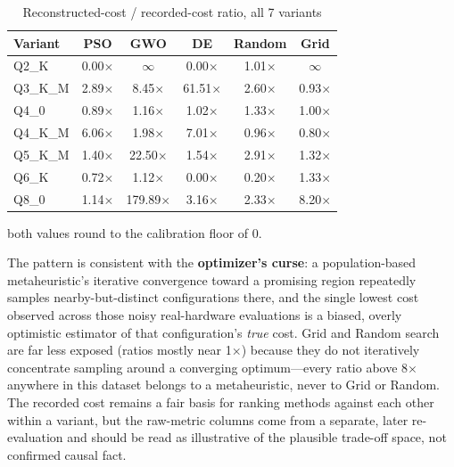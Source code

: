 \documentclass[conference, letterpaper]{IEEEtran}
\begin{document}
\begin{table}[t]
\caption{Reconstructed-cost / recorded-cost ratio, all 7 variants}
\label{tab:reconciliation}
\centering
\footnotesize
\begin{threeparttable}
\begin{tabular}{@{}lccccc@{}}
\toprule
Variant & PSO & GWO & DE & Random & Grid \\
\midrule
Q2\_K    & 0.00$\times$\tnote{c} & $\infty$\tnote{c} & 0.00$\times$\tnote{c} & 1.01$\times$ & $\infty$\tnote{c} \\
Q3\_K\_M & 2.89$\times$ & 8.45$\times$ & 61.51$\times$ & 2.60$\times$ & 0.93$\times$ \\
Q4\_0    & 0.89$\times$ & 1.16$\times$ & 1.02$\times$ & 1.33$\times$ & 1.00$\times$ \\
Q4\_K\_M & 6.06$\times$ & 1.98$\times$ & 7.01$\times$ & 0.96$\times$ & 0.80$\times$ \\
Q5\_K\_M & 1.40$\times$ & 22.50$\times$ & 1.54$\times$ & 2.91$\times$ & 1.32$\times$ \\
Q6\_K    & 0.72$\times$ & 1.12$\times$ & 0.00$\times$\tnote{c} & 0.20$\times$ & 1.33$\times$ \\
Q8\_0    & 1.14$\times$ & 179.89$\times$ & 3.16$\times$ & 2.33$\times$ & 8.20$\times$ \\
\bottomrule
\end{tabular}
\begin{tablenotes}
\item[c] {\scriptsize both values round to the calibration floor of 0.}
\end{tablenotes}
\end{threeparttable}
\end{table}

The pattern is consistent with the \textbf{optimizer's curse}: a population-based metaheuristic's iterative convergence toward a promising region repeatedly samples nearby-but-distinct configurations there, and the single lowest cost observed across those noisy real-hardware evaluations is a biased, overly optimistic estimator of that configuration's \emph{true} cost. Grid and Random search are far less exposed (ratios mostly near 1$\times$) because they do not iteratively concentrate sampling around a converging optimum---every ratio above 8$\times$ anywhere in this dataset belongs to a metaheuristic, never to Grid or Random. The recorded cost remains a fair basis for ranking methods against each other within a variant, but the raw-metric columns come from a separate, later re-evaluation and should be read as illustrative of the plausible trade-off space, not confirmed causal fact.
\end{document}
